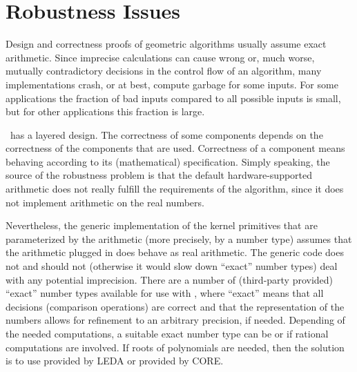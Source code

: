 
\chapter{Robustness Issues\label{chap:robustness}}


Design and correctness proofs of geometric algorithms usually assume exact
arithmetic. Since imprecise calculations can cause wrong or, much worse,
mutually contradictory decisions in the control flow of an algorithm, many
implementations crash, or at best, compute garbage for some inputs. For
some applications the fraction of bad inputs compared to all possible
inputs is small, but for other applications this fraction is large.

\cgal\ has a layered design. The correctness of some components depends
on the correctness of the components that are used. Correctness of
a component means behaving according to its (mathematical) specification.
Simply speaking, the source of the robustness problem is that the default
hardware-supported arithmetic does not really fulfill the requirements of 
the algorithm, since it does not implement arithmetic on the real numbers.

Nevertheless, the generic implementation of the kernel primitives that are 
parameterized by the arithmetic (more precisely, by a number type)
assumes that the arithmetic plugged in does behave as real arithmetic.
The generic code does not and should not (otherwise it would slow down 
``exact'' number types) deal with any potential imprecision. There are
a number of (third-party provided) ``exact'' number types available for use
with \cgal, where ``exact'' means
that all decisions (comparison operations) are correct and that the
representation of the numbers allows for refinement to an arbitrary precision, 
if needed. 
Depending of the needed computations, a suitable exact number type
can be  or  if rational computations
are involved. 
If roots of polynomials are needed, then the solution is to use 
  provided by LEDA or  provided by CORE.


